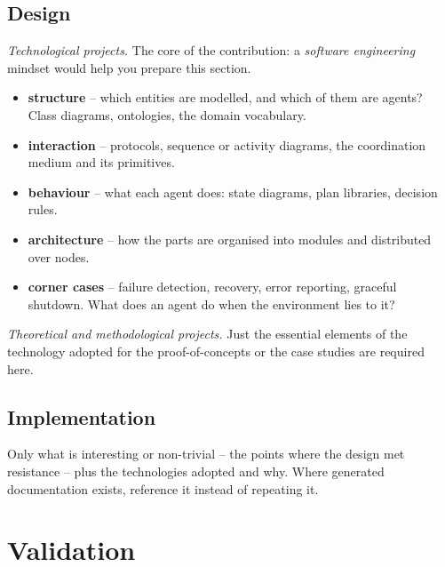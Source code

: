 \documentclass[11pt,a4paper]{scrartcl}
\begin{document}
\subsection{Design}
\label{sec:design}

\begin{guidance}
\emph{Technological projects.} 
%
The core of the contribution: a \emph{software engineering} mindset would help you prepare this section.
%
\begin{itemize}
  \item \textbf{structure} – which entities are modelled, and which of them are agents? Class diagrams, ontologies, the domain vocabulary.
  \item \textbf{interaction} – protocols, sequence or activity diagrams, the coordination medium and its primitives.
  \item \textbf{behaviour} – what each agent does: state diagrams, plan libraries, decision rules.
  \item \textbf{architecture} – how the parts are organised into modules and distributed over nodes.
  \item \textbf{corner cases} – failure detection, recovery, error reporting, graceful shutdown. What does an agent do when the environment lies to it?
\end{itemize}

\emph{Theoretical and methodological projects.} 
%
Just the essential elements of the technology adopted for the proof-of-concepts or the case studies are required here.
\end{guidance}

\subsection{Implementation}
\label{sec:implementation}

\begin{guidance}
Only what is interesting or non-trivial – the points where the design met resistance – plus the technologies adopted and why. 
%
Where generated documentation exists, reference it instead of repeating it.
\end{guidance}

\section{Validation}
\label{sec:validation}
\end{document}
